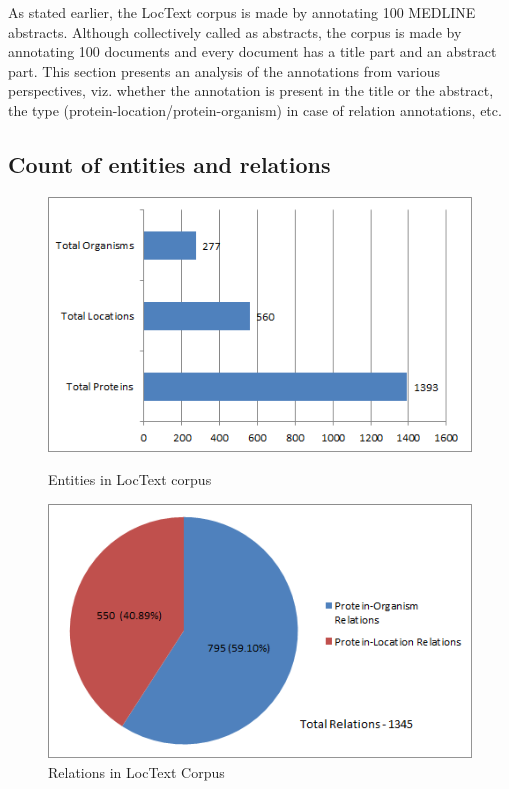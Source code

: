 As stated earlier, the LocText corpus is made by annotating 100 MEDLINE abstracts. Although collectively called as abstracts, the corpus is made by annotating 100 documents and every document has a title part and an abstract part. This section presents an analysis of the annotations from various perspectives, viz. whether the annotation is present in the title or the abstract, the type (protein-location/protein-organism) in case of relation annotations, etc.

\subsection*{Count of entities and relations}

\begin{figure}
\centering
\begin{minipage}{.5\textwidth}
  \centering
  \includegraphics[width=.95\textwidth]{figures/ProtLocOrg_Distribution.png}
  \caption{Entities in LocText corpus}
  \label{fig:LocText_Entities}
\end{minipage}%
\begin{minipage}{.5\textwidth}
  \centering
  \includegraphics[width=.95\textwidth]{figures/AllRelationsPie.png}
  \caption{Relations in LocText Corpus}
  \label{fig:LocText_Relations}
\end{minipage}
\end{figure}

